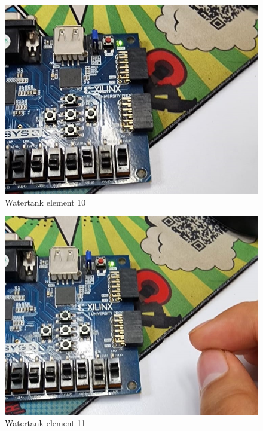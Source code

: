 \documentclass{article}
\begin{document}
\begin{multicols}{2}
	\begin{figure}[H]
		\centering
		\includegraphics[width=1\linewidth]{images/diagrams/watertank/watertank10.jpg}
		\caption{Watertank element 10}
		\label{Watertank element 10 Apendix}
	\end{figure}

	\begin{figure}[H]
		\centering
		\includegraphics[width=1\linewidth]{images/diagrams/watertank/watertank11.jpg}
		\caption{Watertank element 11}
		\label{Watertank element 11 Apendix}
	\end{figure}


\end{multicols}
\end{document}
